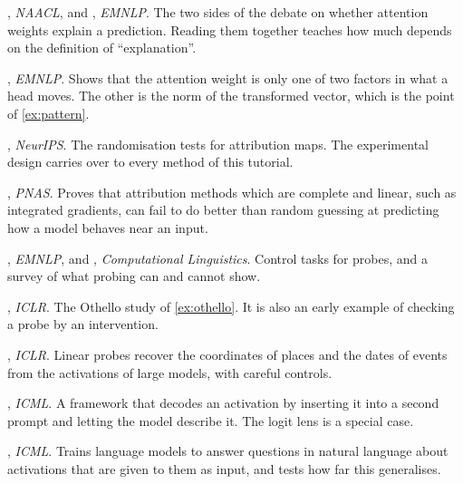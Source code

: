\begin{readinglist}
\item \citet{jain2019attention}, \emph{NAACL}, and \citet{wiegreffe2019attention}, \emph{EMNLP}. The two sides of
the debate on whether attention weights explain a prediction. Reading them together teaches how much depends on
the definition of ``explanation''.
\item \citet{kobayashi2020attention}, \emph{EMNLP}. Shows that the attention weight is only one of two factors in what
a head moves. The other is the norm of the transformed vector, which is the point of \cref{ex:pattern}.
\item \citet{adebayo2018sanity}, \emph{NeurIPS}. The randomisation tests for attribution maps. The experimental
design carries over to every method of this tutorial.
\item \citet{bilodeau2024impossibility}, \emph{PNAS}. Proves that attribution methods which are complete and
linear, such as integrated gradients, can fail to do better than random guessing at predicting how a model behaves
near an input.
\item \citet{hewitt2019designing}, \emph{EMNLP}, and \citet{belinkov2022probing}, \emph{Computational Linguistics}.
Control tasks for probes, and a survey of what probing can and cannot show.
\item \citet{li2023emergent}, \emph{ICLR}. The Othello study of \cref{ex:othello}. It is also an early example of
checking a probe by an intervention.
\item \citet{gurnee2024language}, \emph{ICLR}. Linear probes recover the coordinates of places and the dates of
events from the activations of large models, with careful controls.
\item \citet{ghandeharioun2024patchscopes}, \emph{ICML}. A framework that decodes an activation by inserting it
into a second prompt and letting the model describe it. The logit lens is a special case.
\item \citet{karvonen2026activation}, \emph{ICML}. Trains language models to answer questions in natural language
about activations that are given to them as input, and tests how far this generalises.
\end{readinglist}
